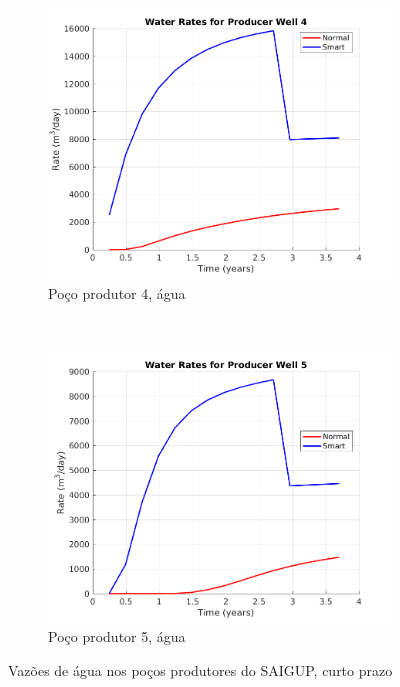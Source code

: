 \begin{figure}[!ht]
	\begin{subfigure}[b]{.3\textwidth}
		\includegraphics[width=\textwidth]{figs/resultadosSSAIGUP/SSAIGUP_WaterWell4_Zoom}
		\caption{Po\c{c}o produtor 4, \'{a}gua}
		\label{SSAIGUP_WaterWell4}
	\end{subfigure}
	~
	\begin{subfigure}[b]{.3\textwidth}
		\includegraphics[width=\textwidth]{figs/resultadosSSAIGUP/SSAIGUP_WaterWell5_Zoom}
		\caption{Po\c{c}o produtor 5, \'{a}gua}
		\label{SSAIGUP_WaterWell5}
	\end{subfigure}
	\caption{Vaz\~{o}es de \'{a}gua nos po\c{c}os produtores do SAIGUP, curto prazo}
	\label{SSAIGUP_WaterRates}
\end{figure}


